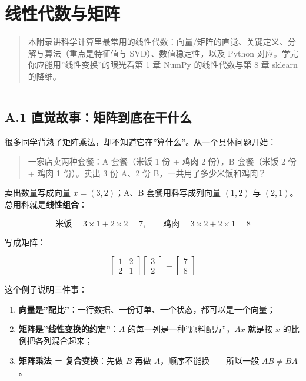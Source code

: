 \chapter{线性代数与矩阵}\label{ux7ebfux6027ux4ee3ux6570ux4e0eux77e9ux9635}

\begin{quote}
本附录讲科学计算里最常用的线性代数：向量/矩阵的直觉、关键定义、分解与算法（重点是特征值与
SVD）、数值稳定性，以及 Python 对应。学完你应能用''线性变换''的眼光看第
1 章 NumPy 的线性代数与第 8 章 sklearn 的降维。
\end{quote}

\begin{center}\rule{0.5\linewidth}{0.5pt}\end{center}

\section{A.1
直觉故事：矩阵到底在干什么}\label{a.1-ux76f4ux89c9ux6545ux4e8bux77e9ux9635ux5230ux5e95ux5728ux5e72ux4ec0ux4e48}

很多同学背熟了矩阵乘法，却不知道它在''算什么''。从一个具体问题开始：

\begin{quote}
一家店卖两种套餐：A 套餐（米饭 1 份 + 鸡肉 2 份），B 套餐（米饭 2 份 +
鸡肉 1 份）。卖出 3 份 A、2 份 B，一共用了多少米饭和鸡肉？
\end{quote}

卖出数量写成向量 \(x=(3,2)\)；A、B 套餐用料写成列向量 \((1,2)\) 与
\((2,1)\)。总用料就是\textbf{线性组合}：

\[\text{米饭} = 3\times 1 + 2\times 2 = 7,\qquad \text{鸡肉} = 3\times 2 + 2\times 1 = 8\]

写成矩阵：

\[\begin{bmatrix} 1 & 2 \\ 2 & 1 \end{bmatrix} \begin{bmatrix} 3 \\ 2 \end{bmatrix} = \begin{bmatrix} 7 \\ 8 \end{bmatrix}\]

这个例子说明三件事：

\begin{enumerate}
\def\labelenumi{\arabic{enumi}.}
\tightlist
\item
  \textbf{向量是''配比''}：一行数据、一份订单、一个状态，都可以是一个向量；
\item
  \textbf{矩阵是''线性变换的约定''}：\(A\)
  的每一列是一种''原料配方''，\(Ax\) 就是按 \(x\) 的比例把各列混合起来；
\item
  \textbf{矩阵乘法 = 复合变换}：先做 \(B\) 再做
  \(A\)，顺序不能换------所以一般 \(AB\ne BA\)。
\end{enumerate}

